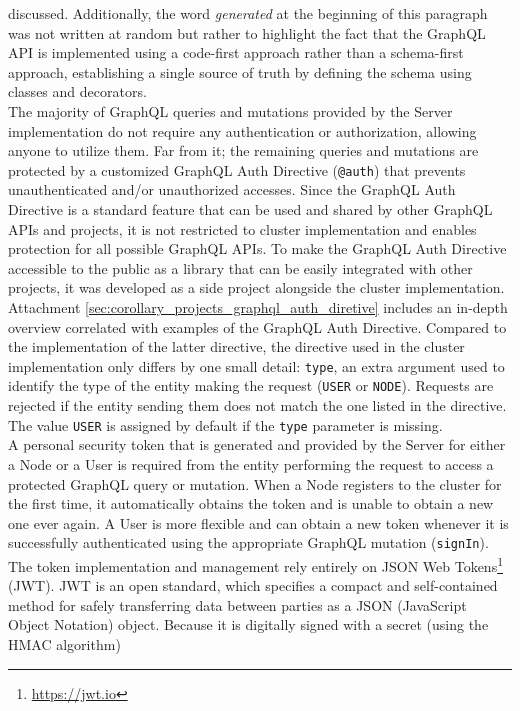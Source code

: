 discussed. Additionally, the word \textit{generated} at the beginning of this paragraph
was not written at random but rather to highlight the fact that the GraphQL API is
implemented using a code-first approach rather than a schema-first approach,
establishing a single source of truth by defining the schema using classes and
decorators. \\ %
The majority of GraphQL queries and mutations provided by the Server
implementation do not require any authentication or authorization, allowing anyone
to utilize them. Far from it; the remaining queries and mutations are protected by
a customized GraphQL Auth Directive (\texttt{@auth}) that prevents
unauthenticated and/or unauthorized accesses. Since the GraphQL Auth Directive is
a standard feature that can be used and shared by other GraphQL APIs and projects,
it is not restricted to cluster implementation and enables protection for all
possible GraphQL APIs. To make the GraphQL Auth Directive accessible to the public
as a library that can be easily integrated with other projects, it was developed
as a side project alongside the cluster implementation. Attachment \ref{sec:corollary_projects_graphql_auth_diretive}
includes an in-depth overview correlated with examples of the GraphQL Auth Directive.
Compared to the implementation of the latter directive, the directive used in the
cluster implementation only differs by one small detail: \texttt{type}, an extra
argument used to identify the type of the entity making the request (\texttt{USER}
or \texttt{NODE}). Requests are rejected if the entity sending them does not match
the one listed in the directive. The value \texttt{USER} is assigned by default if
the \texttt{type} parameter is missing. \\ %
A personal security token that is generated and provided by the Server for
either a Node or a User is required from the entity performing the request to
access a protected GraphQL query or mutation. When a Node registers to the cluster
for the first time, it automatically obtains the token and is unable to obtain a
new one ever again. A User is more flexible and can obtain a new token whenever it
is successfully authenticated using the appropriate GraphQL mutation (\texttt{signIn}).
The token implementation and management rely entirely on JSON Web Tokens\footnote{\url{https://jwt.io}}
(JWT). JWT is an open standard, which specifies a compact and self-contained method
for safely transferring data between parties as a JSON (JavaScript Object
Notation) object. Because it is digitally signed with a secret (using the HMAC algorithm)
